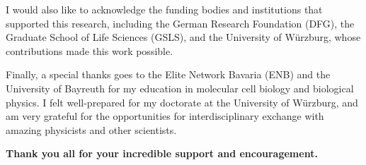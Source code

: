 {  \noindent I would also like to acknowledge the funding bodies and
  institutions that supported this research, including the German Research
  Foundation (DFG), the Graduate School of Life Sciences (GSLS), and the University of
  Würzburg, whose contributions made this work possible.

  \noindent Finally, a special thanks goes to the Elite Network Bavaria (ENB)
  and the University of Bayreuth for my education in molecular cell biology
  and biological physics. I felt well-prepared for my doctorate at the
  University of Würzburg, and am very grateful for the opportunities for
  interdisciplinary exchange with amazing physicists and other scientists.

  \begin{center}
      {\textbf{Thank you all for your incredible support and encouragement.}}
  \end{center}
 }
